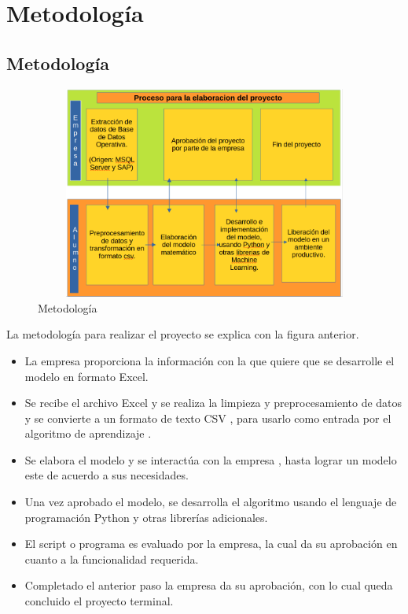 \chapter{Metodología}\label{cap4:Metodologia}

\section{Metodología}

\begin{figure}[H]
    \centering
       \includegraphics[width=12cm, height=7cm ]{Imagenes/Proceso_Proyecto.PNG }
      \caption{Metodología}
      \label{fig:meto}
\end{figure}

La metodología para realizar el proyecto se explica con la figura anterior.

\begin{itemize}
    \item La empresa proporciona la información con la que quiere que se desarrolle el modelo en formato Excel. \medskip
    \item Se recibe el archivo Excel y se realiza la limpieza y preprocesamiento de datos y se convierte a un formato de texto CSV , para usarlo como entrada por el algoritmo de aprendizaje . \medskip
    \item Se elabora el modelo y se interactúa con la empresa , hasta lograr un modelo este de acuerdo a sus necesidades. \medskip
    \item Una vez aprobado el modelo, se desarrolla el algoritmo usando el lenguaje de programación Python y otras librerías adicionales.\medskip
    \item El script o programa es evaluado por la empresa, la cual da su aprobación en cuanto a la funcionalidad requerida. \medskip
    \item Completado el anterior paso la empresa da su aprobación, con lo cual queda concluido el proyecto terminal. \medskip 
\end{itemize}

